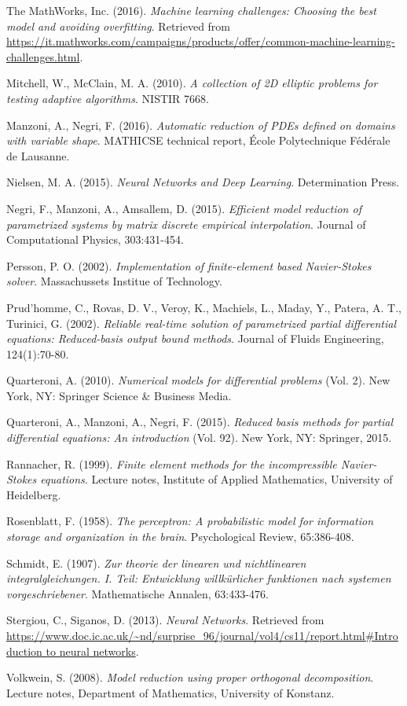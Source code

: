 \documentclass[longtitle]{elsarticle}
\numberwithin{equation}{section}
\theoremstyle{theorem}
\theoremstyle{definition}
\theoremstyle{remark}
\theoremstyle{proposition}
\numberwithin{figure}{section}
\begin{document}
\begin{thebibliography}{50}
		The MathWorks, Inc. (2016). \emph{Machine learning challenges: Choosing the best model and avoiding overfitting}. Retrieved from \url{https://it.mathworks.com/campaigns/products/offer/common-machine-learning-challenges.html}.
		
		Mitchell, W., McClain, M. A. (2010). \emph{A collection of 2D elliptic problems for testing adaptive algorithms}. NISTIR 7668.
		
		Manzoni, A., Negri, F. (2016). \emph{Automatic reduction of PDEs defined on domains with variable shape}. MATHICSE technical report, \'Ecole Polytechnique F\'ed\'erale de Lausanne.
		
		Nielsen, M. A. (2015). \emph{Neural Networks and Deep Learning}. Determination Press.
				
		Negri, F., Manzoni, A., Amsallem, D. (2015). \emph{Efficient model reduction of parametrized systems by matrix discrete empirical interpolation}. Journal of Computational Physics, 303:431-454.
		
		Persson, P. O. (2002). \emph{Implementation of finite-element based Navier-Stokes solver}. Massachussets Institue of Technology.
		
		Prud'homme, C., Rovas, D. V., Veroy, K., Machiels, L., Maday, Y., Patera, A. T., Turinici, G. (2002). \emph{Reliable real-time solution of parametrized partial differential equations: Reduced-basis output bound methods}. Journal of Fluids Engineering, 124(1):70-80.
		
		Quarteroni, A. (2010). \emph{Numerical models for differential problems} (Vol. 2). New York, NY: Springer Science \& Business Media.
		
		Quarteroni, A., Manzoni, A., Negri, F. (2015). \emph{Reduced basis methods for partial differential equations: An introduction} (Vol. 92). New York, NY: Springer, 2015.
		
		Rannacher, R. (1999). \emph{Finite element methods for the incompressible Navier-Stokes equations}. Lecture notes, Institute of Applied Mathematics, University of Heidelberg.
		
		Rosenblatt, F. (1958). \emph{The perceptron: A probabilistic model for information storage and organization in the brain}. Psychological Review, 65:386-408.
		
		Schmidt, E. (1907). \emph{Zur theorie der linearen und nichtlinearen integralgleichungen. I. Teil: Entwicklung willk\"urlicher funktionen nach systemen vorgeschriebener}. Mathematische Annalen, 63:433-476.
		
		Stergiou, C., Siganos, D. (2013). \emph{Neural Networks}. Retrieved from \url{https://www.doc.ic.ac.uk/~nd/surprise_96/journal/vol4/cs11/report.html#Introduction to neural networks}.
		
		Volkwein, S. (2008). \emph{Model reduction using proper orthogonal decomposition}. Lecture notes, Department of Mathematics, University of Konstanz.
	\end{thebibliography}
	
\end{document}
